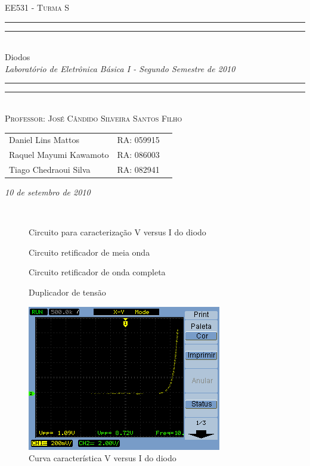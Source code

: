 \documentclass[a4paper]{article} %
\date{Agosto 20, 2010}
\newcommand*{\titleTMB}{\begingroup \centering \settowidth{\unitlength}{\LARGE EE531} {\large\scshape EE531 - Turma S}\\[0.2\baselineskip] \rule{11.0cm}{1.6pt}\vspace*{-\baselineskip}\vspace*{2pt} \rule{11.0cm}{0.4pt}\\[\baselineskip] {\LARGE  Diodos}\\\vspace*{\baselineskip}  {\itshape Laboratório de Eletrônica Básica I - Segundo Semestre de 2010}\\ \rule{11.0cm}{0.4pt}\vspace*{-\baselineskip}\vspace{3.2pt} \rule{11.0cm}{1.6pt}\\[\baselineskip] {\large\scshape Professor: José Cândido Silveira Santos Filho}\par \vfill {\normalsize   \scshape 
    \begin{center} 
      \begin{tabular}{  l  l  p{5cm} } 
 	Daniel Lins Mattos & RA: 059915\\
        Raquel Mayumi Kawamoto & RA: 086003\\
        Tiago Chedraoui Silva  & RA: 082941\\
      \end{tabular} \end{center}
    \itshape 10 de setembro de 2010    }\\[\baselineskip] \vspace{3.2pt} \endgroup}
\begin{document}
\titleTMB 
\newpage

\vspace{3mm}
\begin{figure}[h]
\centerline{}
\caption{Circuito para caracterização V versus I do diodo \label{tab:circ}}
\end{figure}

\vspace{3mm}
\begin{figure}[h]
\centerline{}
\caption{Circuito retificador de meia onda \label{tab:circ}}
\end{figure}

\vspace{3mm}
\begin{figure}[h]
\centerline{}
\caption{Circuito retificador de onda completa  \label{tab:circ}}
\end{figure}


\newpage
\vspace{3mm}
\begin{figure}[h]
\centerline{}
\caption{Duplicador de tensão \label{tab:circ}}
\end{figure}



\begin{figure}[h!]
\begin{centering}
\includegraphics[scale=0.7]{Imagens/3.1/q1} \caption{Curva característica V versus I do diodo \label{fig:q1-curva}}
\par\end{centering}
\end{figure}
\end{document}
